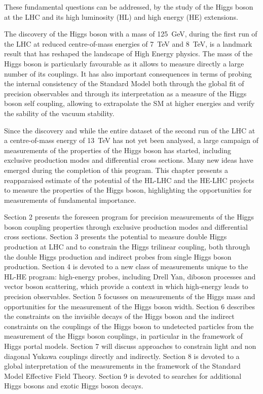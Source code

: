 \documentclass[../report.tex]{subfiles}
\begin{document}
These fundamental questions can be addressed, by the study of the
Higgs boson at the LHC and its high luminosity (HL) and high energy
(HE) extensions.

The discovery of the Higgs boson with a mass of 125~GeV, during the
first run of the LHC at reduced centre-of-mass energies of 7~TeV and
8~TeV, is a landmark result that has reshaped the landscape of High
Energy physics. The mass of the Higgs boson is particularly favourable
as it allows to measure directly a large number of its couplings. It
has also important consequences in terms of probing the internal
consistency of the Standard Model both through the global fit of
precision observables and through its interpretation as a measure of
the Higgs boson self coupling, allowing to extrapolate the SM at
higher energies and verify the sability of the vacuum
stability.

Since the discovery and while the entire dataset of the second run of
the LHC at a centre-of-mass energy of 13~TeV has not yet been
analysed, a large campaign of measurements of the properties of the
Higgs boson has started, including exclusive production modes and
differential cross sections. Many new ideas have emerged during the
completion of this program. This chapter presents a reapparaised
estimate of the potential of the HL-LHC and the HE-LHC projects to
measure the properties of the Higgs boson, highlighting the
opportunities for measurements of fundamental importance.

Section 2 presents the foreseen program for precision measurements of
the Higgs boson coupling properties through exclusive production modes
and differential cross sections. Section 3 presents the potential to
measure double Higgs production at LHC and to constrain the Higgs
trilinear coupling, both through the double Higgs production and
indirect probes from single Higgs boson production. Section 4 is
devoted to a new class of measurements unique to the HL-HE program:
high-energy probes, including Drell Yan, diboson processes and vector
boson scattering, which provide a context in which high-energy leads
to precision observables. Section 5 focusses on measurements of the
Higgs mass and opportunities for the measurement of the Higgs boson
width. Section 6 describes the constraints on the invisible decays of
the Higgs boson and the indirect constraints on the couplings of the
Higgs boson to undetected particles from the measurement of the Higgs
boson couplings, in particular in the framework of Higgs portal
models. Section 7 will discuss approaches to constrain light and non
diagonal Yukawa couplings directly and indirectly. Section 8 is
devoted to a global interpretation of the measurements in the
framework of the Standard Model Effective Field Theory. Section 9 is
devoted to searches for additional Higgs bosons and exotic Higgs boson
decays.
\end{document}
